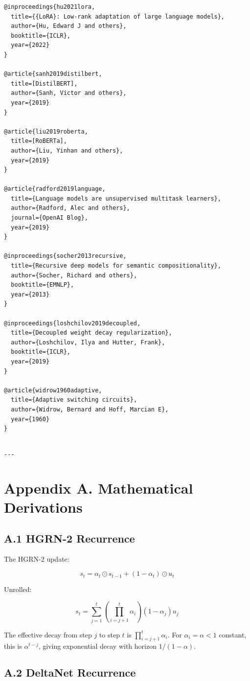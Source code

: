 \begin{lstlisting}
@inproceedings{hu2021lora,
  title={{LoRA}: Low-rank adaptation of large language models},
  author={Hu, Edward J and others},
  booktitle={ICLR},
  year={2022}
}

@article{sanh2019distilbert,
  title=[DistilBERT],
  author={Sanh, Victor and others},
  year={2019}
}

@article{liu2019roberta,
  title=[RoBERTa],
  author={Liu, Yinhan and others},
  year={2019}
}

@article{radford2019language,
  title={Language models are unsupervised multitask learners},
  author={Radford, Alec and others},
  journal={OpenAI Blog},
  year={2019}
}

@inproceedings{socher2013recursive,
  title={Recursive deep models for semantic compositionality},
  author={Socher, Richard and others},
  booktitle={EMNLP},
  year={2013}
}

@inproceedings{loshchilov2019decoupled,
  title={Decoupled weight decay regularization},
  author={Loshchilov, Ilya and Hutter, Frank},
  booktitle={ICLR},
  year={2019}
}

@article{widrow1960adaptive,
  title={Adaptive switching circuits},
  author={Widrow, Bernard and Hoff, Marcian E},
  year={1960}
}
\end{lstlisting}
\begin{lstlisting}

---
\end{lstlisting}

\section{Appendix A. Mathematical Derivations}

\subsection{A.1 HGRN-2 Recurrence}

The HGRN-2 update:

\[
s_t = \alpha_t \odot s_{t-1} + (1 - \alpha_t) \odot u_t
\tag{A.1}
\]

Unrolled:

\[
s_t = \sum_{j=1}^{t} \left( \prod_{i=j+1}^{t} \alpha_i \right) (1 - \alpha_j) u_j
\tag{A.2}
\]

The effective decay from step $j$ to step $t$ is $\prod_{i=j+1}^t \alpha_i$. 
For $\alpha_i = \alpha < 1$ constant, this is $\alpha^{t-j}$, giving 
exponential decay with horizon $1/(1-\alpha)$.

\subsection{A.2 DeltaNet Recurrence}

